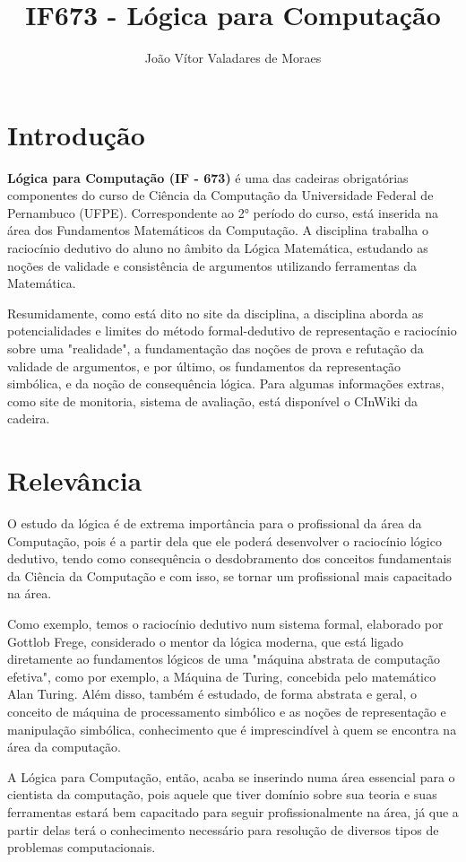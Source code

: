 \documentclass[a4paper]{article}
\title{IF673 - Lógica para Computação}
\author{João Vítor Valadares de Moraes}
\begin{document}
\maketitle

\section{Introdução}
\textbf{Lógica para Computação (IF - 673)} é uma das cadeiras obrigatórias componentes do curso de Ciência da Computação da Universidade Federal de Pernambuco (UFPE). Correspondente ao 2° período do curso, está inserida na área dos Fundamentos Matemáticos da Computação. A disciplina trabalha o raciocínio dedutivo do aluno no âmbito da Lógica Matemática, estudando as noções de validade e consistência de argumentos utilizando ferramentas da Matemática. 

Resumidamente, como está dito no site da disciplina\cite{SiteDisciplina}, a disciplina aborda as potencialidades e limites do método formal-dedutivo de representação e raciocínio sobre uma "realidade", a fundamentação das noções de prova e refutação da validade de argumentos, e por último, os fundamentos da representação simbólica, e da noção de consequência lógica. 
Para algumas informações extras, como site de monitoria, sistema de avaliação, está disponível o CInWiki da cadeira.\cite{WikiLogica}


\section{Relevância}
O estudo da lógica é de extrema importância para o profissional da área da Computação, pois é a partir dela que ele poderá desenvolver o raciocínio lógico dedutivo, tendo como consequência o desdobramento dos conceitos fundamentais da Ciência da Computação e com isso, se tornar um profissional mais capacitado na área.

Como exemplo, temos o raciocínio dedutivo num sistema formal, elaborado por Gottlob Frege, considerado o mentor da lógica moderna, que está ligado diretamente ao fundamentos lógicos de uma "máquina abstrata de computação efetiva", como por exemplo, a Máquina de Turing, concebida pelo matemático Alan Turing.
Além disso, também é estudado, de forma abstrata e geral, o conceito de máquina de processamento simbólico e as noções de representação e manipulação simbólica, conhecimento que é imprescindível à quem se encontra na área da computação.

A Lógica para Computação, então, acaba se inserindo numa área essencial para o cientista da computação, pois aquele que tiver domínio sobre sua teoria e suas ferramentas estará bem capacitado para seguir profissionalmente na área, já que a partir delas terá o conhecimento necessário para resolução de diversos tipos de problemas computacionais.
\end{document}
